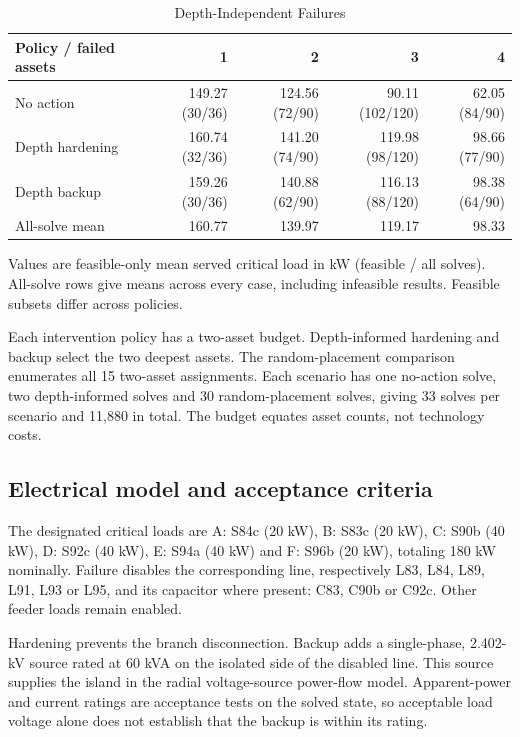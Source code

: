 \documentclass[conference]{IEEEtran}
\begin{document}
\begin{table}[!t]
\caption{Depth-Independent Failures}
\label{tab:ind}
\centering
\renewcommand{\arraystretch}{1.15}
\begin{tabular}{lrrrr}
\toprule
Policy / failed assets & 1 & 2 & 3 & 4 \\
\midrule
No action & 149.27 (30/36) & 124.56 (72/90) & 90.11 (102/120) & 62.05 (84/90) \\
Depth hardening & 160.74 (32/36) & 141.20 (74/90) & 119.98 (98/120) & 98.66 (77/90) \\
Depth backup & 159.26 (30/36) & 140.88 (62/90) & 116.13 (88/120) & 98.38 (64/90) \\
\quad All-solve mean & 160.77 & 139.97 & 119.17 & 98.33 \\
\bottomrule
\end{tabular}
\par\smallskip
\begin{minipage}{0.95\textwidth}\footnotesize
Values are feasible-only mean served critical load in kW (feasible / all solves). All-solve rows give means across every case, including infeasible results. Feasible subsets differ across policies.
\end{minipage}
\end{table}

Each intervention policy has a two-asset budget. Depth-informed hardening and backup select the two deepest assets. The random-placement comparison enumerates all 15 two-asset assignments. Each scenario has one no-action solve, two depth-informed solves and 30 random-placement solves, giving 33 solves per scenario and 11,880 in total. The budget equates asset counts, not technology costs.

\subsection{Electrical model and acceptance criteria}

The designated critical loads are A: S84c (20 kW), B: S83c (20 kW), C: S90b (40 kW), D: S92c (40 kW), E: S94a (40 kW) and F: S96b (20 kW), totaling 180 kW nominally. Failure disables the corresponding line, respectively L83, L84, L89, L91, L93 or L95, and its capacitor where present: C83, C90b or C92c. Other feeder loads remain enabled.

Hardening prevents the branch disconnection. Backup adds a single-phase, 2.402-kV source rated at 60 kVA on the isolated side of the disabled line. This source supplies the island in the radial voltage-source power-flow model. Apparent-power and current ratings are acceptance tests on the solved state, so acceptable load voltage alone does not establish that the backup is within its rating.
\end{document}
